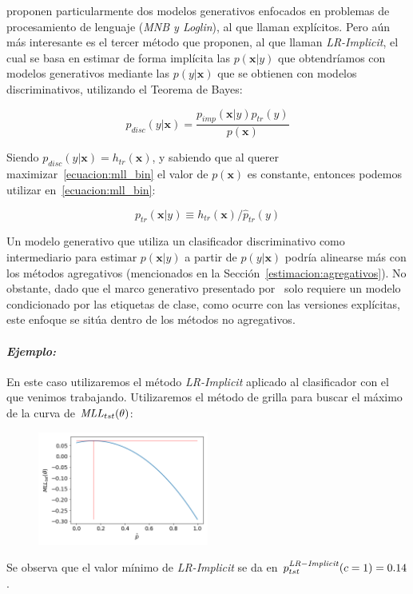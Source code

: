 \citet{keith2018uncertainty} proponen particularmente dos modelos generativos
enfocados en problemas de procesamiento de lenguaje ({\it MNB\/ y \it
Loglin\/}), al que llaman explícitos. Pero aún más interesante es el tercer
método que proponen, al que llaman {\it LR-Implicit}, el cual se basa en estimar
de forma implícita las \(p(\boldsymbol{x}|y)\) que obtendríamos con modelos
generativos mediante las \(p(y|\boldsymbol{x})\) que se obtienen con modelos
discriminativos, utilizando el Teorema de Bayes:

\begin{equation}\label{ecuacion:disc_gen}
    p_{disc}(y|\boldsymbol{x}) = \frac{p_{imp}(\boldsymbol{x}|y)p_{tr}(y)}{p(\boldsymbol{x})}
\end{equation}

Siendo \(p_{disc}(y|\boldsymbol{x})=h_{tr}(\boldsymbol{x})\), y sabiendo que al
querer maximizar~\ref{ecuacion:mll_bin} el valor de \(p(\boldsymbol{x})\) es
constante, entonces podemos utilizar en~\ref{ecuacion:mll_bin}:

\begin{equation}\label{ecuacion:disc_gen_2}
    p_{tr}(\boldsymbol{x}|y) \equiv h_{tr}(\boldsymbol{x}) / {\hat p_{tr}(y)}
\end{equation}

Un modelo generativo que utiliza un clasificador discriminativo como
intermediario para estimar \(p(\boldsymbol{x}|y)\) a partir de
\(p(y|\boldsymbol{x})\) podría alinearse más con los métodos agregativos
(mencionados en la Sección~\ref{estimacion:agregativos}). No obstante, dado que el
marco generativo presentado por~\citet{keith2018uncertainty} solo requiere un
modelo condicionado por las etiquetas de clase, como ocurre con las versiones
explícitas, este enfoque se sitúa dentro de los métodos no agregativos.

\paragraph{\it Ejemplo:\/} En este caso utilizaremos el método {\it LR-Implicit}
aplicado al clasificador con el que venimos trabajando. Utilizaremos el método
de grilla para buscar el máximo de la curva de \({\it MLL\/}_{tst}(\theta)\):
\begin{figure}[H]
    \centerline{\includegraphics[width=0.5\textwidth]{../plots_teoria/lr_implicit.png}}
    \caption{}\label{fig:lr_implicit}
\end{figure}

Se observa que el valor mínimo de {\it LR-Implicit} se da en \(p^{\it
LR-Implicit \/}_{tst}(c=1) = 0.14\).

